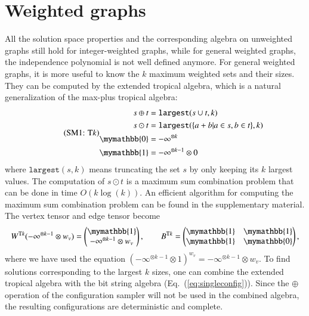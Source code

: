 \documentclass[onefignum, onetabnum]{siamart190516}
\newcommand{\eqname}[1]{\stepcounter{equation}\tag{\theequation : #1}}
\newcommand{\<}{\langle}
\renewcommand{\>}{\rangle}
\newcommand{\Eq}[1]{Eq.~(\ref{#1})}
\begin{document}
\section{Weighted graphs}\label{sec:weighted}
All the solution space properties and the corresponding algebra on unweighted graphs still hold for integer-weighted graphs, while for general weighted graphs, the independence polynomial is not well defined anymore.
For general weighted graphs, it is more useful to know the $k$ maximum weighted sets and their sizes.
They can be computed by the extended tropical algebra, which is a natural generalization of the max-plus tropical algebra:
\begin{equation}
\eqname{T$k$}
\begin{split}
    s \oplus t &= \texttt{largest}(s \cup t, k)\\
    s \odot t &= \texttt{largest}(\{a+b | a \in s, b\in t\}, k)\\
    \mymathbb{0} &= -\infty^{\otimes k}\\
    \mymathbb{1} &= -\infty^{\otimes k-1} \otimes 0
\end{split}\label{eq:ext-tropical}
\end{equation}
where $\texttt{largest}(s, k)$ means truncating the set $s$ by only keeping its $k$ largest values.
The computation of $s \odot t$ is a maximum sum combination problem that can be done in time $O(k\log(k))$.
An efficient algorithm for computing the maximum sum combination problem can be found in the supplementary material.
The vertex tensor and edge tensor become
\begin{equation}
    W^{{\rm T}k}(-\infty^{\otimes k-1} \otimes w_v) = \left(\begin{matrix}
        \mymathbb{1} \\
        -\infty^{\otimes k-1} \otimes w_v
    \end{matrix}\right),   
    \qquad
        B^{{\rm T}k} = \left(\begin{matrix}
        \mymathbb{1}  & \mymathbb{1} \\
        \mymathbb{1} & \mymathbb{0}
    \end{matrix}\right),
\end{equation}
where we have used the equation $(-\infty^{\otimes k-1} \otimes 1)^{w_v} = -\infty^{\otimes k-1} \otimes w_v$.
To find solutions corresponding to the largest $k$ sizes, one can combine the extended tropical algebra with the bit string algebra (\Eq{eq:singleconfig}).
Since the $\oplus$ operation of the configuration sampler will not be used in the combined algebra, the resulting configurations are deterministic and complete.
\end{document}
